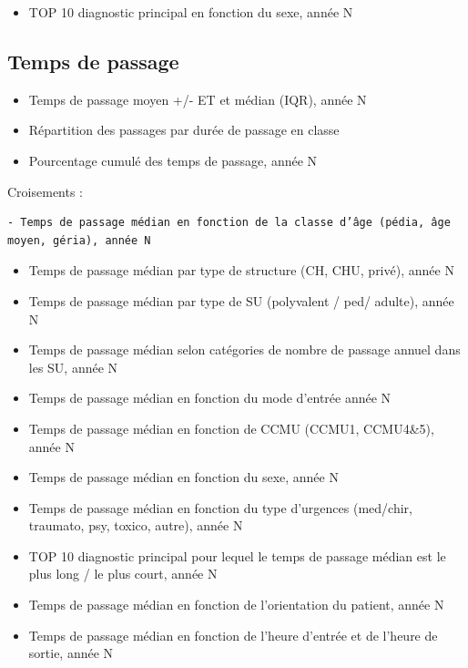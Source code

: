 \documentclass[]{article}
\begin{document}
\begin{itemize}
\itemsep1pt\parskip0pt
\item
  TOP 10 diagnostic principal en fonction du sexe, année N
\end{itemize}

\subsection{Temps de passage}\label{temps-de-passage}

\begin{itemize}
\itemsep1pt\parskip0pt
\item
  Temps de passage moyen +/- ET et médian (IQR), année N
\item
  Répartition des passages par durée de passage en classe
\item
  Pourcentage cumulé des temps de passage, année N
\end{itemize}

Croisements :

\begin{verbatim}
- Temps de passage médian en fonction de la classe d’âge (pédia, âge moyen, géria), année N
\end{verbatim}

\begin{itemize}
\itemsep1pt\parskip0pt
\item
  Temps de passage médian par type de structure (CH, CHU, privé), année
  N
\item
  Temps de passage médian par type de SU (polyvalent / ped/ adulte),
  année N
\item
  Temps de passage médian selon catégories de nombre de passage annuel
  dans les SU, année N
\item
  Temps de passage médian en fonction du mode d'entrée année N
\item
  Temps de passage médian en fonction de CCMU (CCMU1, CCMU4\&5), année N
\item
  Temps de passage médian en fonction du sexe, année N
\item
  Temps de passage médian en fonction du type d'urgences (med/chir,
  traumato, psy, toxico, autre), année N
\item
  TOP 10 diagnostic principal pour lequel le temps de passage médian est
  le plus long / le plus court, année N
\item
  Temps de passage médian en fonction de l'orientation du patient, année
  N
\item
  Temps de passage médian en fonction de l'heure d'entrée et de l'heure
  de sortie, année N
\end{itemize}
\end{document}
